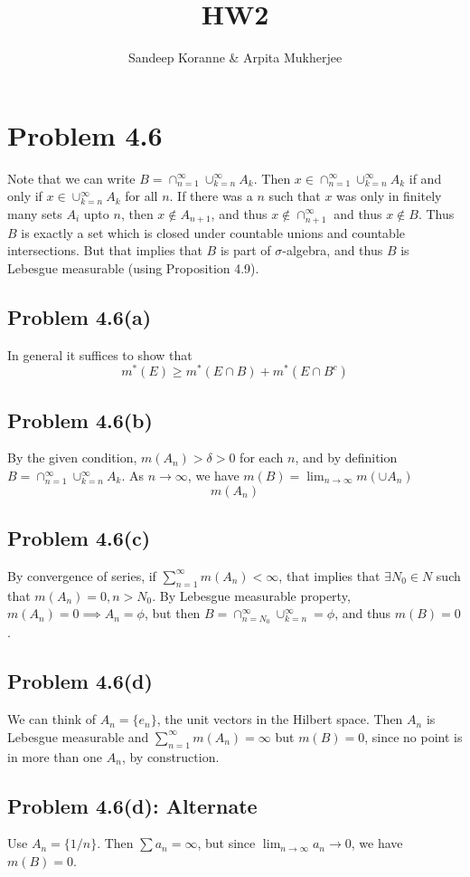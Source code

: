 \documentclass{article}
\begin{document}
\title{HW2}
\author{ Sandeep Koranne \& Arpita Mukherjee}
\maketitle

\section{Problem 4.6}
Note that we can write $B=\cap_{n=1}^\infty \cup_{k=n}^\infty A_k$.
Then $x\in \cap_{n=1}^\infty \cup_{k=n}^\infty A_k$ if and only if
$x\in \cup_{k=n}^\infty A_k$ for all $n$. If there was a $n$ such
that $x$ was only in finitely many sets $A_i$ upto $n$, then
$x\not\in A_{n+1}$, and thus $x\not\in \cap_{n+1}^\infty$ and thus
$x\not\in B$. Thus $B$ is exactly a set which is closed under
countable unions and countable intersections. But that implies
that $B$ is part of $\sigma$-algebra, and thus $B$ is Lebesgue
measurable (using Proposition 4.9).

\subsection{Problem 4.6(a)}
In general it suffices to show that
\[
m^*(E) \ge m^*(E\cap B) + m^*(E\cap B^c)
\]
\subsection{Problem 4.6(b)}
By the given condition, $m(A_n)>\delta>0$ for each $n$, and
by definition $B=\cap_{n=1}^\infty \cup_{k=n}^\infty A_k$.
As $n\to\infty$, we have $m(B)=\lim_{n\to\infty}m(\cup A_n)$
\[
m(A_n)
\]
\subsection{Problem 4.6(c)}
By convergence of series, if $\sum_{n=1}^\infty m(A_n) < \infty$, that
implies that $\exists N_0\in N$ such that $m(A_n)=0, n>N_0$.
By Lebesgue measurable property, $m(A_n)=0 \implies A_n=\phi$, but
then $B=\cap_{n=N_0}^\infty \cup_{k=n}^\infty=\phi$, and thus $m(B)=0$.

\subsection{Problem 4.6(d)}
We can think of $A_n=\{e_n\}$, the unit vectors in the Hilbert space.
Then $A_n$ is Lebesgue measurable and $\sum_{n=1}^\infty m(A_n)=\infty$
but $m(B)=0$, since no point is in more than one $A_n$, by construction.

\subsection{Problem 4.6(d): Alternate}
Use $A_n=\{1/n\}$. Then $\sum a_n = \infty$, but since $\lim_{n\to\infty} a_n\to 0$, we have $m(B)=0$.
\end{document}
